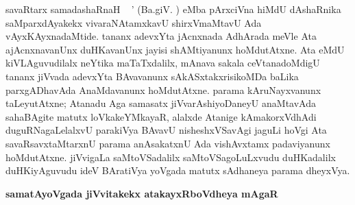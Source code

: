 savaRtarx sama\-dashaRnaH \eng{\rule{.029cm}{.2cm}}~\eng{\rule{.029cm}{.2cm}} ' (Ba.giV. ) eMba pArxciVna hiMdU dAshaRnika saMparxdAyakekx vivaraNAtamxkavU shirxVmaMtavU Ada vAyxKAyxnadaMtide. tananx adevxYta jAcnxnada AdhArada meVle Ata ajAcnxnavanUnx duHKavanUnx jayisi shAMti\-yanunx hoMdu\-tAtxne. Ata eMdU kiVLAguvudilalx neYtika maTaTxdalilx, mAnava sakala ceVtanadoMdigU tananx jiVvada adevxYta BAvavanunx sAkASxtakxrisikoMDa baLika parxgADha\-vAda AnaMdavanunx hoMdu\-tAtxne. parama kAruNayxvanunx taLeyutAtxne; Atanadu Aga samasatx jiVvarAshi\-yoDaneyU anaMtavAda sahaBAgite matutx loVkakeYMkayaR, alalxde Atanige kAma\-korxVdhAdi duguRNagaLelalxvU parakiVya BAvavU nisheshxVSavAgi jaguLi hoVgi Ata savaRsavxtaMtarxnU parama anA\-sakatxnU Ada vishAvxtamx padaviyanunx hoMdu\-tAtxne. jiVvi\-gaLa saMtoVSadalilx saMtoVSagoLuLxvudu duHKadalilx duHKiyAguvudu ideV BAra\-tiVya yoVgada matutx sAdhaneya parama dheyxVya.

\bigskip
\begin{center}
{\Large\bf samatAyoVgada jiVvitakekx atakayxRboVdheya mAgaR}
\end{center}

